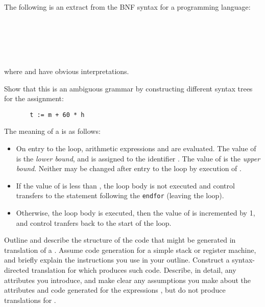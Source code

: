 \begin{questions}
The following is an extract from the BNF syntax for
a programming language:
\begin{bnf}
 \\
 \\
 \\
 \\
\end{bnf}
where  and  have obvious interpretations.
\begin{subquestions}
\subsubquestion
Show that this is an ambiguous grammar by constructing different
syntax trees for the assignment:
\begin{verbatim}
       t := m + 60 * h
\end{verbatim}
\subquestion
The meaning of a  is as follows:
\begin{itemize}
\item On entry to the loop, arithmetic expressions  and 
        are evaluated. The value of  is the {\em lower
        bound}, and is assigned to the identifier .
        The value of  is the {\em upper bound}.
        Neither may be changed after entry to the loop by 
        execution of .
\item If the value of  is less than ,
        the loop body  is
        not executed and control transfers to the statement following
        the \verb"endfor" (leaving the loop).
\item Otherwise, the loop body  is
        executed,  
        then the value of  is incremented by 1,
        and control tranfers back to the start of the loop.
\end{itemize}

\begin{subsubquestions}
\subsubquestion
        Outline and describe the structure of the
        code that might be generated in translation of
        a .  Assume code generation for a simple
        stack or register machine, and briefly explain the
        instructions you use in your outline.
\subsubquestion
        Construct a syntax-directed translation for 
         which produces such code.
        Describe, in detail, any attributes you
        introduce, and make clear any assumptions you make about 
        the attributes and code generated for the
        expressions , but do not produce translations for
        .
\end{subsubquestions}
\end{subquestions}


\end{questions}
